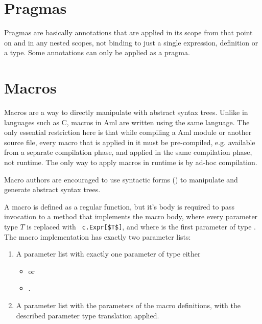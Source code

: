 




\section{Pragmas}
\label{sec:pragmas}

Pragmas are basically annotations that are applied in its scope from that point on and in any nested scopes, not binding to just a single expression, definition or a type. Some annotations can only be applied as a pragma. 






\section{Macros}
\label{sec:macros}

Macros are a way to directly manipulate with abstract syntax trees. Unlike in languages such as C, macros in Aml are written using the same language. The only essential restriction here is that while compiling a Aml module or another source file, every macro that is applied in it must be pre-compiled, e.g. available from a separate compilation phase, and applied in the same compilation phase, not runtime. The only way to apply macros in runtime is by ad-hoc compilation. 

Macro authors are encouraged to use syntactic forms () to manipulate and generate abstract syntax trees. 

A macro is defined as a regular function, but it's body is required to pass invocation to a method that implements the macro body, where every parameter type $T$ is replaced with ~\lstinline!c.Expr[$T$]!, and where  is the first parameter of type . The macro implementation has exactly two parameter lists: 
\begin{enumerate}
  \item A parameter list with exactly one parameter of type either
    \begin{itemize}
      \item {} or 
      \item {}.
    \end{itemize} 
  \item A parameter list with the parameters of the macro definitions, with the described parameter type translation applied. 
\end{enumerate}

